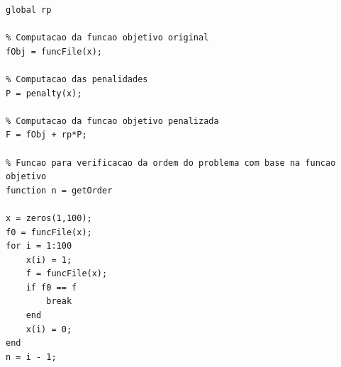\documentclass[12pt]{article}
\begin{document}
\begin{enumerate}
\begin{lstlisting}
global rp

% Computacao da funcao objetivo original
fObj = funcFile(x);

% Computacao das penalidades
P = penalty(x);

% Computacao da funcao objetivo penalizada
F = fObj + rp*P;

% Funcao para verificacao da ordem do problema com base na funcao objetivo
function n = getOrder

x = zeros(1,100);
f0 = funcFile(x);
for i = 1:100
	x(i) = 1;
	f = funcFile(x);
	if f0 == f
		break
	end
	x(i) = 0;
end
n = i - 1;
 			\end{lstlisting}
 		\end{enumerate}
\end{document}
